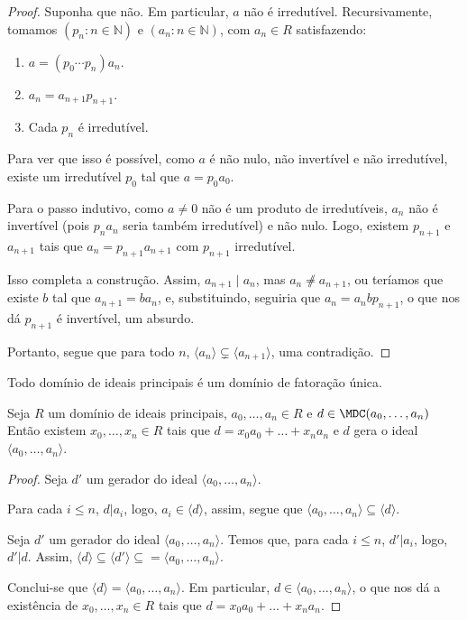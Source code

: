 \begin{proof}
    Suponha que não.
    Em particular, $a$ não é irredutível.
    Recursivamente, tomamos $(p_n: n \in \mathbb N)$ e $(a_n: n \in \mathbb N)$, com $a_n\in R$ satisfazendo:
    \begin{enumerate}[label=\alph*)]
        \item $a=(p_0\cdots p_n) a_n$.
        \item $a_{n}=a_{n+1}p_{n+1}$.
        \item Cada $p_n$ é irredutível.
    \end{enumerate}
    Para ver que isso é possível, como $a$ é não nulo, não invertível e não irredutível, existe um irredutível $p_0$ tal que $a=p_0a_0$.
    
    Para o passo indutivo, como $a\neq 0$ não é um produto de irredutíveis, $a_n$ não é invertível (pois $p_na_n$ seria também irredutível) e não nulo.
    Logo, existem $p_{n+1}$ e $a_{n+1}$ tais que $a_n=p_{n+1}a_{n+1}$ com $p_{n+1}$ irredutível.

    Isso completa a construção.
    Assim, $a_{n+1}\mid a_{n}$, mas $a_{n}\not \neq a_{n+1}$, ou teríamos que existe $b$ tal que $a_{n+1}=ba_n$, e, substituindo, seguiria que $a_n=a_nbp_{n+1}$, o que nos dá $p_{n+1}$ é invertível, um absurdo.

    Portanto, segue que para todo $n$, $\langle a_n\rangle\subsetneq \langle a_{n+1}\rangle$, uma contradição.
\end{proof}

\begin{corol}
    Todo domínio de ideais principais é um domínio de fatoração única.
\end{corol}

\begin{prop}
    Seja $R$ um domínio de ideais principais, $a_0, \dots, a_n \in R$ e $d\in \MDC(a_0, \dots, a_n)$
    Então existem $x_0, \dots, x_n \in R$ tais que $d=x_0a_0+\dots+x_na_n$ e $d$ gera o ideal $\langle a_0, \dots, a_n\rangle$.
\end{prop}
\begin{proof}
    Seja $d'$ um gerador do ideal $\langle a_0, \dots, a_n\rangle$.

    Para cada $i\leq n$, $d|a_i$, logo, $a_i \in \langle d\rangle$, assim, segue que $\langle a_0, \dots, a_n\rangle \subseteq \langle d\rangle$.

        Seja $d'$ um gerador do ideal $\langle a_0, \dots, a_n\rangle$. Temos que, para cada $i\leq n$, $d'|a_i$, logo, $d'|d$. Assim, $\langle d\rangle\subseteq \langle d'\rangle\subseteq =\langle a_0, \dots, a_n\rangle$.

        Conclui-se que $\langle d\rangle = \langle a_0, \dots, a_n\rangle$. Em particular, $d \in \langle a_0, \dots, a_n\rangle$, o que nos dá a existência de $x_0, \dots, x_n \in R$ tais que $d=x_0a_0+\dots+x_na_n$.
\end{proof}
